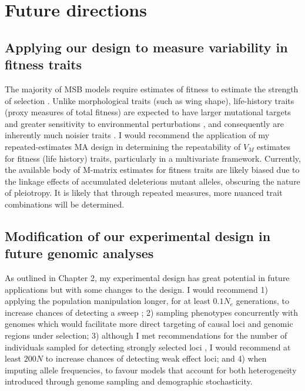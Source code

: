 \section{Future directions}
\subsection{Applying our design to measure variability in fitness traits}

The majority of MSB models require estimates of fitness to estimate the strength of selection \citep{Wals18}.   Unlike morphological traits (such as wing shape), 
life-history traits (proxy measures of total fitness) are expected to have larger mutational targets and greater sensitivity to environmental perturbations \citep{Houl96, Houl98},  and consequently are inherently much noisier traits \citep{Lync98,Wals18}.  I would recommend the application of my repeated-estimates MA design in determining the repeatability of $V_M$ estimates for fitness (life history) traits, particularly in a multivariate framework. Currently, the available body of M-matrix estimates for fitness traits are likely biased due to the linkage effects of accumulated deleterious mutant alleles, obscuring the nature of pleiotropy. It is likely that through repeated measures, more nuanced trait combinations will be determined. \par

\subsection{Modification of our experimental design in future genomic analyses}
As outlined in Chapter 2, my experimental design has great potential in future applications but with some changes to the design. I would recommend 1) applying the population manipulation longer, for at least $0.1N_e$ generations, to increase chances of detecting a sweep \citep{Wals18}; 2) sampling phenotypes concurrently with genomes which would facilitate more direct targeting of causal loci and genomic regions under selection; 3) although I met recommendations for the number of individuals sampled for detecting strongly selected loci \citep[$50N$,][]{Schl15}, I would recommend at least $200N$ to increase chances of detecting weak effect loci; and 4) when imputing allele frequencies, to favour models that account for both heterogeneity introduced through genome sampling and demographic stochasticity.\par

